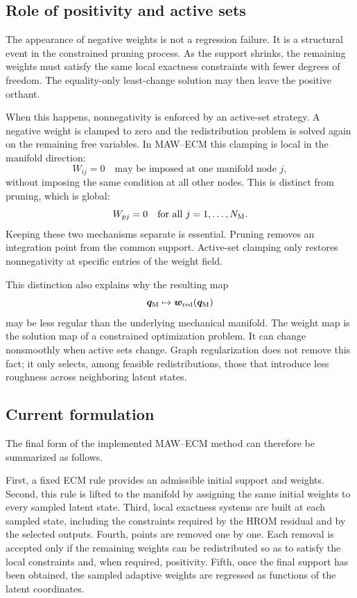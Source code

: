\documentclass[11pt,a4paper]{article}
\begin{document}
\subsection{Role of positivity and active sets}

The appearance of negative weights is not a regression failure. It is a
structural event in the constrained pruning process. As the support shrinks, the
remaining weights must satisfy the same local exactness constraints with fewer
degrees of freedom. The equality-only least-change solution may then leave the
positive orthant.

When this happens, nonnegativity is enforced by an active-set strategy. A
negative weight is clamped to zero and the redistribution problem is solved
again on the remaining free variables. In MAW--ECM this clamping is local in
the manifold direction:
\[
        W_{ij}=0
        \quad\text{may be imposed at one manifold node }j,
\]
without imposing the same condition at all other nodes. This is distinct from
pruning, which is global:
\[
        W_{pj}=0
        \quad\text{for all }j=1,\ldots,N_{\mathrm{M}}.
\]
Keeping these two mechanisms separate is essential. Pruning removes an
integration point from the common support. Active-set clamping only restores
nonnegativity at specific entries of the weight field.

This distinction also explains why the resulting map
\[
        \bm q_{\mathrm{M}}\mapsto\bm w_{\mathrm{red}}(\bm q_{\mathrm{M}})
\]
may be less regular than the underlying mechanical manifold. The weight map is
the solution map of a constrained optimization problem. It can change
nonsmoothly when active sets change. Graph regularization does not remove this
fact; it only selects, among feasible redistributions, those that introduce
less roughness across neighboring latent states.

\subsection{Current formulation}

The final form of the implemented MAW--ECM method can therefore be summarized as
follows.

First, a fixed ECM rule provides an admissible initial support and weights.
Second, this rule is lifted to the manifold by assigning the same initial
weights to every sampled latent state. Third, local exactness systems are built
at each sampled state, including the constraints required by the HROM residual
and by the selected outputs. Fourth, points are removed one by one. Each removal
is accepted only if the remaining weights can be redistributed so as to satisfy
the local constraints and, when required, positivity. Fifth, once the final
support has been obtained, the sampled adaptive weights are regressed as
functions of the latent coordinates.
\end{document}
